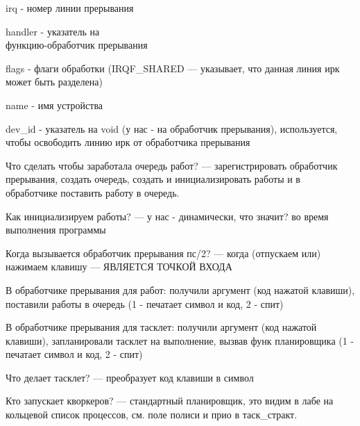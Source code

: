irq - номер линии прерывания

handler - указатель на \\ функцию-обработчик прерывания

flags - флаги обработки (IRQF\_SHARED --- указывает, что данная линия ирк может быть разделена)

name - имя устройства

dev\_id - указатель на void (у нас - на обработчик прерывания), используется, чтобы освободить линию ирк от обработчика прерывания

Что сделать чтобы заработала очередь работ? --- зарегистрировать обработчик прерывания, создать очередь, создать и инициализировать работы и в обработчике поставить работу в очередь.

Как инициализируем работы? --- у нас - динамически, что значит? во время выполнения программы

Когда вызывается обработчик прерывания пс/2? --- когда (отпускаем или) нажимаем клавишу --- ЯВЛЯЕТСЯ ТОЧКОЙ ВХОДА

В обработчике прерывания для работ: получили аргумент (код нажатой клавиши), поставили работы в очередь (1 - печатает символ и код, 2 - спит)

В обработчике прерывания для тасклет: получили аргумент (код нажатой клавиши), запланировали тасклет на выполнение, вызвав функ планировщика (1 - печатает символ и код, 2 - спит)

Что делает тасклет? --- преобразует код клавиши в символ

Кто запускает кворкеров? --- стандартный планировщик, это видим в лабе на кольцевой список процессов, см. поле полиси и прио в таск\_стракт.







